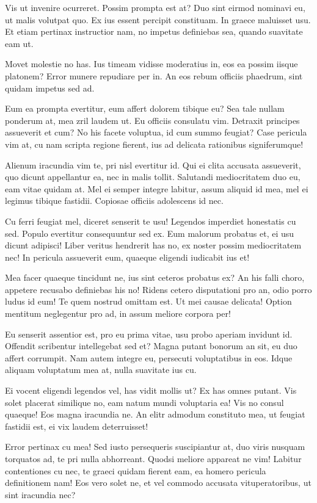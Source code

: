 \documentclass[
	12pt,				%
	openright,			%
	oneside,			%
	a4paper,			%
	english,			%
	french,				%
	spanish,			%
	brazil,				%
	]{abntex2}
\begin{document}
Vis ut invenire ocurreret. Possim prompta est at? Duo sint eirmod nominavi eu, ut malis volutpat quo. Ex ius essent percipit constituam. In graece maluisset usu. Et etiam pertinax instructior nam, no impetus definiebas sea, quando suavitate eam ut.

Movet molestie no has. Ius timeam vidisse moderatius in, eos ea possim iisque platonem? Error munere repudiare per in. An eos rebum officiis phaedrum, sint quidam impetus sed ad.

Eum ea prompta evertitur, eum affert dolorem tibique eu? Sea tale nullam ponderum at, mea zril laudem ut. Eu officiis consulatu vim. Detraxit principes assueverit et cum? No his facete voluptua, id cum summo feugiat? Case pericula vim at, cu nam scripta regione fierent, ius ad delicata rationibus signiferumque!

Alienum iracundia vim te, pri nisl evertitur id. Qui ei clita accusata assueverit, quo dicunt appellantur ea, nec in malis tollit. Salutandi mediocritatem duo eu, eam vitae quidam at. Mel ei semper integre labitur, assum aliquid id mea, mel ei legimus tibique fastidii. Copiosae officiis adolescens id nec.

Cu ferri feugiat mel, diceret senserit te usu! Legendos imperdiet honestatis cu sed. Populo evertitur consequuntur sed ex. Eum malorum probatus et, ei usu dicunt adipisci! Liber veritus hendrerit has no, ex noster possim mediocritatem nec! In pericula assueverit eum, quaeque eligendi iudicabit ius et!

Mea facer quaeque tincidunt ne, ius sint ceteros probatus ex? An his falli choro, appetere recusabo definiebas his no! Ridens cetero disputationi pro an, odio porro ludus id eum! Te quem nostrud omittam est. Ut mei causae delicata! Option mentitum neglegentur pro ad, in assum meliore corpora per!

Eu senserit assentior est, pro eu prima vitae, usu probo aperiam invidunt id. Offendit scribentur intellegebat sed et? Magna putant bonorum an sit, eu duo affert corrumpit. Nam autem integre eu, persecuti voluptatibus in eos. Idque aliquam voluptatum mea at, nulla suavitate ius cu.

Ei vocent eligendi legendos vel, has vidit mollis ut? Ex has omnes putant. Vis solet placerat similique no, eam natum mundi voluptaria ea! Vis no consul quaeque! Eos magna iracundia ne. An elitr admodum constituto mea, ut feugiat fastidii est, ei vix laudem deterruisset!

Error pertinax cu mea! Sed iusto persequeris suscipiantur at, duo viris nusquam torquatos ad, te pri nulla abhorreant. Quodsi meliore appareat ne vim! Labitur contentiones cu nec, te graeci quidam fierent eam, ea homero pericula definitionem nam! Eos vero solet ne, et vel commodo accusata vituperatoribus, ut sint iracundia nec?
\end{document}
